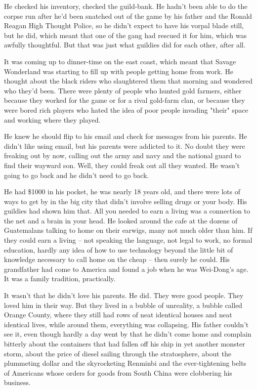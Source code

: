He checked his inventory, checked the guild-bank. He hadn't been
able to do the corpse run after he'd been snatched out of the game
by his father and the Ronald Reagan High Thought Police, so he
didn't expect to have his vorpal blade still, but he did, which
meant that one of the gang had rescued it for him, which was
awfully thoughtful. But that was just what guildies did for each
other, after all.

It was coming up to dinner-time on the east coast, which meant that
Savage Wonderland was starting to fill up with people getting home
from work. He thought about the black riders who slaughtered them
that morning and wondered who they'd been. There were plenty of
people who hunted gold farmers, either because they worked for the
game or for a rival gold-farm clan, or because they were bored rich
players who hated the idea of poor people invading "their" space
and working where they played.

He knew he should flip to his email and check for messages from his
parents. He didn't like using email, but his parents were addicted
to it. No doubt they were freaking out by now, calling out the army
and navy and the national guard to find their wayward son. Well,
they could freak out all they wanted. He wasn't going to go back
and he didn't need to go back.

He had \$1000 in his pocket, he was nearly 18 years old, and there
were lots of ways to get by in the big city that didn't involve
selling drugs or your body. His guildies had shown him that. All
you needed to earn a living was a connection to the net and a brain
in your head. He looked around the cafe at the dozens of
Guatemalans talking to home on their earwigs, many not much older
than him. If they could earn a living -- not speaking the language,
not legal to work, no formal education, hardly any idea of how to
use technology beyond the little bit of knowledge necessary to call
home on the cheap -- then surely he could. His grandfather had come
to America and found a job when he was Wei-Dong's age. It was a
family tradition, practically.

It wasn't that he didn't love his parents. He did. They were good
people. They loved him in their way. But they lived in a bubble of
unreality, a bubble called Orange County, where they still had rows
of neat identical houses and neat identical lives, while around
them, everything was collapsing. His father couldn't see it, even
though hardly a day went by that he didn't come home and complain
bitterly about the containers that had fallen off his ship in yet
another monster storm, about the price of diesel sailing through
the stratosphere, about the plummeting dollar and the skyrocketing
Renminbi and the ever-tightening belts of Americans whose orders
for goods from South China were clobbering his business.

